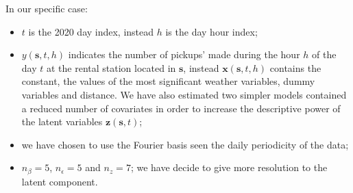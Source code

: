 In our specific case:
\begin{itemize}
	\item $t$ is the \num{2020} day index, instead $h$ is the day hour index; 
	\item $y(\boldsymbol{s}, t, h)$ indicates the number of pickups' made during the hour $h$ of the day $t$ at the rental station located in $\boldsymbol{s}$, instead $\boldsymbol{x}(\boldsymbol{s}, t, h)$ contains the constant, the values of the most significant weather variables, dummy variables and distance. We have also estimated two simpler models contained a reduced number of covariates in order to increase the descriptive power of the latent variables $\boldsymbol{z}(\boldsymbol{s}, t)$;
	\item we have chosen to use the Fourier basis seen the daily periodicity of the data;
	\item $n_\beta = 5$, $n_\epsilon = 5$ and $n_z = 7$; we have decide to give more resolution to the latent component.
\end{itemize}
